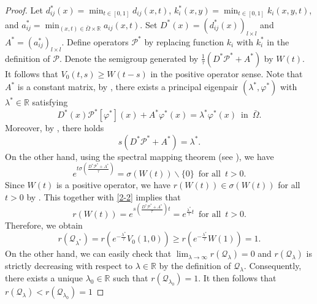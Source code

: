 \documentclass[11pt,reqno]{amsart}
\numberwithin{equation}{section}
\begin{document}
\begin{proof}
Let $d_{ij}^{*}(x) = \min_{t\in [0,1]} d_{ij}(x,t)$, $k^{*}_{i}(x,y) = \min_{t\in [0,1]} k_{i}(x,y,t)$, and $a_{ij}^{*} = \min_{(x,t)\in \bar\Omega\times\mathbb{R}}a_{ij}(x,t)$.
Set $D^{*}(x) = (d_{ij}^{*}(x))_{l\times l}$ and $A^{*}= (a_{ij}^{*})_{l\times l}$.
Define operators $\mathcal{P}^{*}$ by replacing function $k_{i}$ with  $k_{i}^{*}$ in the definition of $\mathcal{P}$.
Denote the semigroup generated by
$ \frac{1}{\tau} \left(D^{*}\mathcal{P}^{*}+A^{*} \right)$ by $W(t)$.
It follows that $V_{0}(t,s) \geq W(t-s)$ in the positive operator sense. Note that $A^{*}$ is a constant matrix, by \cite[Corollary 1.3]{SWZ}, there exists a principal eigenpair
$(\lambda^{*},\varphi^{*})$ with $\lambda^{*} \in \mathbb{R}$ satisfying
\begin{equation*}
D^{*}(x)\mathcal{P}^{*}[\varphi^{*}](x)+A^{*}\varphi^{*}(x) =\lambda^{*}\varphi^{*}(x)
\enspace \text{in} \enspace\bar{\Omega}.
\end{equation*}
Moreover, by \cite[Theorem 1.5]{SWZ}, there holds
\begin{equation}\label{2-2}
s(D^{*}\mathcal{P}^{*}+A^{*} ) = \lambda^{*}.
\end{equation}
On the other hand, using the spectral mapping theorem (see \cite[Lemma 5.8]{Th2}), we have
\begin{equation*}
e^{ t \sigma( \frac{D^{*}\mathcal{P}^{*} + A^{*}}{\tau}  ) } = \sigma\left(W(t)\right)\backslash\{0\}\enspace\text{for all}\enspace t>0.
\end{equation*}
Since $W(t)$ is a positive operator, we have $r(W(t))\in\sigma\left(W(t)\right)$ for all $t>0$ by \cite[Proposition 4.1.1]{MNP}.
This together with \eqref{2-2} implies that
\begin{equation*}
r(W(t))
= e^{ s(\frac{D^{*}\mathcal{P}^{*} + A^{*}}{\tau}) t }
= e^{ \frac{\lambda^{*}}{\tau} t} \enspace\text{for all}\enspace t>0.
\end{equation*}
Therefore, we obtain
\begin{equation*}
r(\mathcal{Q}_{\lambda^{*}})
= r\left(e^{ -\frac{\lambda^{*}}{\tau} } V_{0}(1,0)\right)
\geq r\left(e^{ -\frac{\lambda^{*}}{\tau} } W(1)\right)
= 1.
\end{equation*}
On the other hand, we can easily check that $\lim_{\lambda\to\infty} r(\mathcal{Q}_{\lambda})=0$ and $r(\mathcal{Q}_{\lambda})$ is strictly decreasing with respect to $\lambda\in\mathbb{R}$ by the definition of $\mathcal{Q}_{\lambda}$.
Consequently, there exists a unique $\lambda_{0}\in\mathbb{R}$ such that $r(\mathcal{Q}_{\lambda_{0}})=1$.
It then follows that $r(\mathcal{Q}_{\lambda}) < r(\mathcal{Q}_{\lambda_{0}}) =1 $

\end{proof}
\end{document}
